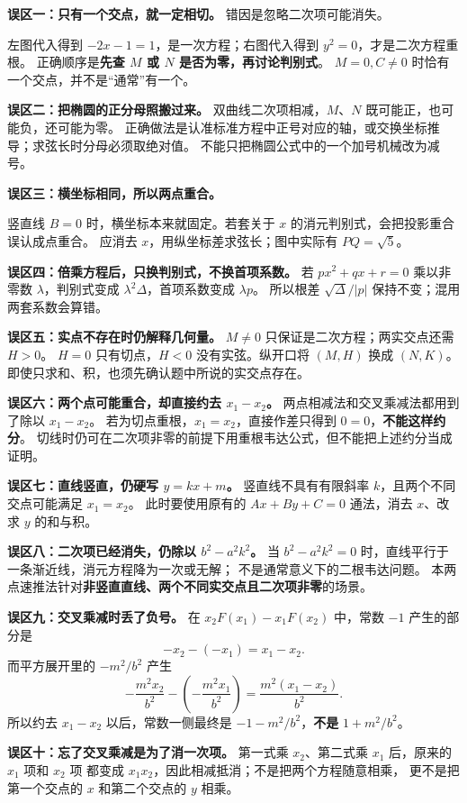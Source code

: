 \begin{trapbox}
\textbf{误区一：只有一个交点，就一定相切。}
错因是忽略二次项可能消失。

左图代入得到 $-2x-1=1$，是一次方程；右图代入得到 $y^2=0$，才是二次方程重根。
正确顺序是\textbf{先查 $M$ 或 $N$ 是否为零，再讨论判别式}。
$M=0,C\ne0$ 时恰有一个交点，并不是“通常”有一个。

\textbf{误区二：把椭圆的正分母照搬过来。}
双曲线二次项相减，$M$、$N$ 既可能正，也可能负，还可能为零。
正确做法是认准标准方程中正号对应的轴，或交换坐标推导；求弦长时分母必须取绝对值。
不能只把椭圆公式中的一个加号机械改为减号。
\end{trapbox}
\clearpage
\begin{trapbox}
\textbf{误区三：横坐标相同，所以两点重合。}

竖直线 $B=0$ 时，横坐标本来就固定。若套关于 $x$ 的消元判别式，会把投影重合误认成点重合。
应消去 $x$，用纵坐标差求弦长；图中实际有 $PQ=\sqrt5$。

\textbf{误区四：倍乘方程后，只换判别式，不换首项系数。}
若 $px^2+qx+r=0$ 乘以非零数 $\lambda$，判别式变成 $\lambda^2\Delta$，首项系数变成 $\lambda p$。
所以根差 $\sqrt{\Delta}/|p|$ 保持不变；混用两套系数会算错。

\textbf{误区五：实点不存在时仍解释几何量。}
$M\ne0$ 只保证是二次方程；两实交点还需 $H>0$。
$H=0$ 只有切点，$H<0$ 没有实弦。纵开口将 $(M,H)$ 换成 $(N,K)$。
即使只求和、积，也须先确认题中所说的实交点存在。
\end{trapbox}
\clearpage
\begin{trapbox}
\textbf{误区六：两个点可能重合，却直接约去 $x_1-x_2$。}
两点相减法和交叉乘减法都用到了除以 $x_1-x_2$。
若为切点重根，$x_1=x_2$，直接作差只得到 $0=0$，\textbf{不能这样约分}。
切线时仍可在二次项非零的前提下用重根韦达公式，但不能把上述约分当成证明。

\textbf{误区七：直线竖直，仍硬写 $y=kx+m$。}
竖直线不具有有限斜率 $k$，且两个不同交点可能满足 $x_1=x_2$。
此时要使用原有的 $Ax+By+C=0$ 通法，消去 $x$、改求 $y$ 的和与积。

\textbf{误区八：二次项已经消失，仍除以 $b^2-a^2k^2$。}
当 $b^2-a^2k^2=0$ 时，直线平行于一条渐近线，消元方程降为一次或无解；
不是通常意义下的二根韦达问题。
本两点速推法针对\textbf{非竖直直线、两个不同实交点且二次项非零}的场景。
\end{trapbox}
\clearpage

\begin{trapbox}
\textbf{误区九：交叉乘减时丢了负号。}
在 $x_2F(x_1)-x_1F(x_2)$ 中，常数 $-1$ 产生的部分是
\[
 -x_2-(-x_1)=x_1-x_2.
\]
而平方展开里的 $-m^2/b^2$ 产生
\[
 -\frac{m^2x_2}{b^2}-\left(-\frac{m^2x_1}{b^2}\right)
 =\frac{m^2(x_1-x_2)}{b^2}.
\]
所以约去 $x_1-x_2$ 以后，常数一侧最终是
$-1-m^2/b^2$，\textbf{不是} $1+m^2/b^2$。

\textbf{误区十：忘了交叉乘减是为了消一次项。}
第一式乘 $x_2$、第二式乘 $x_1$ 后，原来的 $x_1$ 项和 $x_2$ 项
都变成 $x_1x_2$，因此相减抵消；不是把两个方程随意相乘，
更不是把第一个交点的 $x$ 和第二个交点的 $y$ 相乘。
\end{trapbox}
\clearpage
